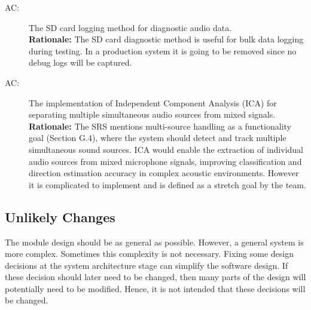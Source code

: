 \documentclass[12pt, titlepage]{article}
\newcounter{acnum}
\newcommand{\actheacnum}{AC\theacnum}
\begin{document}
\begin{description}
\item[ \actheacnum \label{acSDCardLogging}:]
  The SD card logging method for diagnostic audio data.\\
  \textbf{Rationale:} The SD card diagnostic method is useful for bulk data
  logging during testing. In a production system it is going to be removed since
  no debug logs will be captured.

\item[ \actheacnum \label{acICA}:]
  The implementation of Independent Component Analysis (ICA) for separating
  multiple simultaneous audio sources from mixed signals. \\
  \textbf{Rationale:} The SRS mentions multi-source handling as a functionality
  goal (Section G.4), where the system should detect and track multiple
  simultaneous sound sources. ICA would enable the extraction of individual
  audio sources from mixed microphone signals, improving classification and
  direction estimation accuracy in complex acoustic environments. However it is
  complicated to implement and is defined as a stretch goal by the team.
\end{description}

\subsection{Unlikely Changes} \label{SecUchange}

The module design should be as general as possible. However, a general system is
more complex. Sometimes this complexity is not necessary. Fixing some design
decisions at the system architecture stage can simplify the software design. If
these decision should later need to be changed, then many parts of the design
will potentially need to be modified. Hence, it is not intended that these
decisions will be changed.
\end{document}
